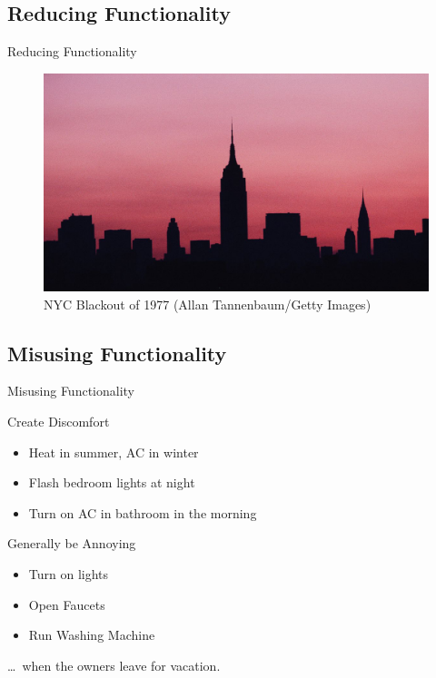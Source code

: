 \documentclass[11pt,t,usepdftitle=false,aspectratio=169]{beamer}
\begin{document}
\subsection{Reducing Functionality}
\begin{frame}{Reducing Functionality}

	\centering
	\begin{figure}
		\includegraphics{img/nyc-blackout.jpg}
		\caption{NYC Blackout of 1977 (Allan Tannenbaum/Getty Images)}
	\end{figure}
\end{frame}

\subsection{Misusing Functionality}
\begin{frame}{Misusing Functionality}
	\begin{block}{Create Discomfort}
		\begin{itemize}
			\item Heat in summer, AC in winter
			\item Flash bedroom lights at night
			\item Turn on AC in bathroom in the morning
		\end{itemize}
	\end{block}
	\begin{block}{Generally be Annoying}
		\begin{itemize}
			\item Turn on lights
			\item Open Faucets
			\item Run Washing Machine
		\end{itemize}
		\pause{}
		\dots~when the owners leave for vacation.
	\end{block}
\end{frame}
\end{document}
